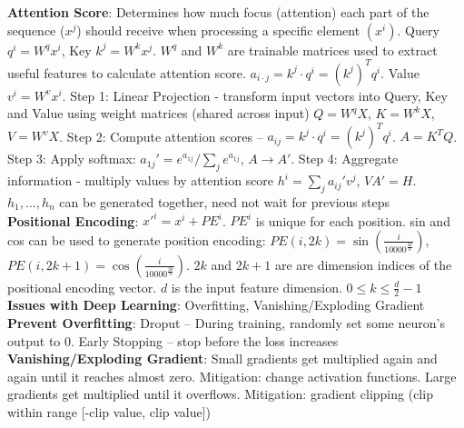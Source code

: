 \documentclass{article}
\begin{document}
{\begin{multicols*}{3}
\textbf{Attention Score}: Determines how much focus (attention) each part of the sequence ($x^j$) should receive when processing a specific element $(x^i)$. Query $q^i=W^qx^i$, Key $k^j=W^kx^j$. $W^q$ and $W^k$ are trainable matrices used to extract useful features to calculate attention score. $a_{i\cdot j}=k^j\cdot q^i=(k^j)^Tq^i$. Value $v^i=W^vx^i$. Step 1: Linear Projection - transform input vectors into Query, Key and Value using weight matrices (shared across input) $Q=W^qX$, $K=W^kX$, $V=W^vX$. Step 2: Compute attention scores – $a_{ij}=k^j\cdot q^i=(k^j)^Tq^i$. $A=K^TQ$. Step 3: Apply softmax: $a_{1j}'=e^{a_{1j}}/\sum_je^{a_{1j}}$, $A\to A'$. Step 4: Aggregate information - multiply values by attention score $h^i=\sum_ja_{ij}'v^j$, $VA'=H$. $h_1,\dots,h_n$ can be generated together, need not wait for previous steps \\
\textbf{Positional Encoding}: $x'^i=x^i+PE^i$. $PE^i$ is unique for each position. sin and cos can be used to generate position encoding: $PE(i,2k)=\sin(\frac{i}{10000^{\frac{2k}{d}}})$, $PE(i, 2k+1)=\cos(\frac{i}{10000^{\frac{2k}{d}}})$. $2k$ and $2k+1$ are are dimension indices of the positional encoding vector. $d$ is the input feature dimension. $0\leq k\leq \frac{d}{2}-1$ \\
\textbf{Issues with Deep Learning}: Overfitting, Vanishing/Exploding Gradient \\
\textbf{Prevent Overfitting}: Droput – During training, randomly set some neuron's output to 0. Early Stopping – stop before the loss increases \\
\textbf{Vanishing/Exploding Gradient}: Small gradients get multiplied again and again until it reaches almost zero. Mitigation: change activation functions. Large gradients get multiplied until it overflows. Mitigation: gradient clipping (clip within range [-clip value, clip value]) 

\end{multicols*}}
\end{document}
